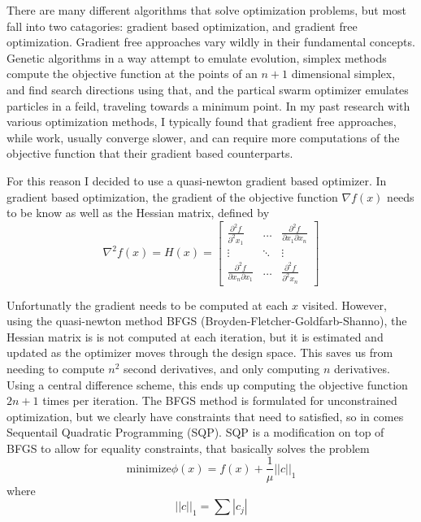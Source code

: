 \documentclass[12pt,parskip=full]{article}
\numberwithin{subsection}{section}
\begin{document}
		There are many different algorithms that solve optimization problems, but most fall into two catagories: gradient based optimization,
		and gradient free optimization. Gradient free approaches vary wildly in their fundamental concepts. Genetic algorithms in a way
		attempt to emulate evolution, simplex methods compute the objective function at the points of an $n + 1$ dimensional simplex, and
		find search directions using that, and the partical swarm optimizer emulates particles in a feild, traveling towards a minimum point.
		In my past research with various optimization methods, I typically found that gradient free approaches, while work, usually converge
		slower, and can require more computations of the objective function that their gradient based counterparts.

		For this reason I decided to use a quasi-newton gradient based optimizer. In gradient based optimization, the gradient of the objective
		function $\nabla f(x)$ needs to be know as well as the Hessian matrix, defined by
		\begin{equation}
			\nabla^2 f(x) = H(x) = \begin{bmatrix}
				\frac{\partial^2 f}{\partial^2 x_1} & \dots & \frac{\partial^2 f}{\partial x_1 \partial x_n} \\
				\vdots & \ddots & \vdots \\
				\frac{\partial^2 f}{\partial x_n \partial x_1} & \dots & \frac{\partial^2 f}{\partial^2 x_n}
			\end{bmatrix}
		\end{equation}

		Unfortunatly the gradient needs to be computed at each $x$ visited. However, using the quasi-newton method BFGS (Broyden-Fletcher-Goldfarb-Shanno),
		the Hessian matrix is is not computed at each iteration, but it is estimated and updated as the optimizer moves through the design space. This saves
		us from needing to compute $n^2$ second derivatives, and only computing $n$ derivatives. Using a central difference scheme, this ends up 
		computing the objective function $2n + 1$ times per iteration. The BFGS method is formulated for unconstrained optimization, but we clearly
		have constraints that need to satisfied, so in comes Sequentail Quadratic Programming (SQP). SQP is a modification on top of BFGS to
		allow for equality constraints, that basically solves the problem
		\begin{equation}
			\mathrm{minimize} \phi(x) = f(x) + \frac{1}{\mu}||c||_1
		\end{equation}
		where
		\begin{equation}
			||c||_1 = \sum{|c_j|}
		\end{equation}
\end{document}
